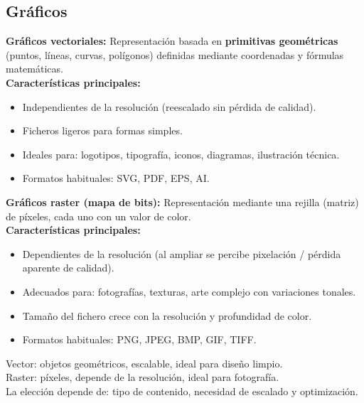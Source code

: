 \documentclass[11pt,a4paper]{article}
\begin{document}
\subsection {Gráficos}
\begin{DefBox}
\textbf{Gráficos vectoriales:} Representación basada en \textbf{primitivas geométricas} (puntos, líneas, curvas, polígonos) definidas mediante coordenadas y fórmulas matemáticas. \\
\textbf{Características principales:}
\begin{itemize}[leftmargin=1.3em]
	\item Independientes de la resolución (reescalado sin pérdida de calidad).
	\item Ficheros ligeros para formas simples.
	\item Ideales para: logotipos, tipografía, iconos, diagramas, ilustración técnica.
	\item Formatos habituales: SVG, PDF, EPS, AI.
\end{itemize}
\end{DefBox}

\begin{DefBox}
\textbf{Gráficos raster (mapa de bits):} Representación mediante una rejilla (matriz) de píxeles, cada uno con un valor de color. \\
\textbf{Características principales:}
\begin{itemize}[leftmargin=1.3em]
	\item Dependientes de la resolución (al ampliar se percibe pixelación / pérdida aparente de calidad).
	\item Adecuados para: fotografías, texturas, arte complejo con variaciones tonales.
	\item Tamaño del fichero crece con la resolución y profundidad de color.
	\item Formatos habituales: PNG, JPEG, BMP, GIF, TIFF.
\end{itemize}
\end{DefBox}

\begin{ResumenBox}
Vector: objetos geométricos, escalable, ideal para diseño limpio. \\
Raster: píxeles, depende de la resolución, ideal para fotografía. \\
La elección depende de: tipo de contenido, necesidad de escalado y optimización.
\end{ResumenBox}
\end{document}
